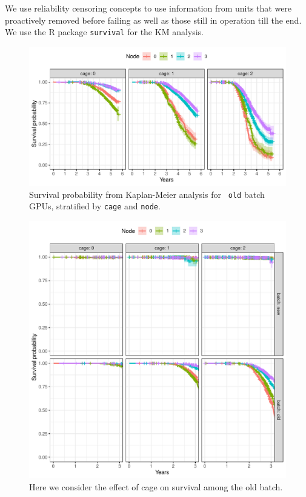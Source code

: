 We use reliability censoring concepts to use information from units
that were proactively removed before failing as well as those still in
operation till the end. We use the R package {\tt survival} for the KM
analysis.
\begin{figure}
  \centering
  \includegraphics[width=6in]{figs/km_cage-node_o001.pdf}
  \caption{Survival probability from Kaplan-Meier analysis for {\tt
      old} batch GPUs, stratified by {\tt cage} and {\tt node}.}
  \label{fig:km-old-cage-node}
\end{figure}
\begin{figure}
  \centering
  \includegraphics[width=6in]{figs/km_cage-node_c001.pdf}
  \caption{Here we consider the effect of cage on survival among the
    old batch.}
  \label{fig:km-all-cage-node}
\end{figure}

